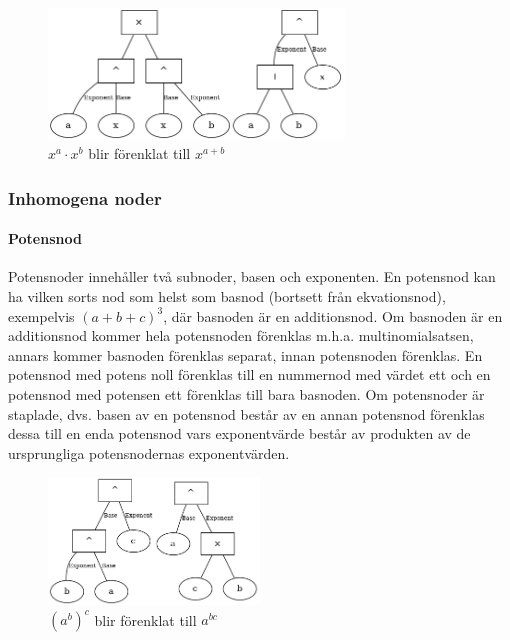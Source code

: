 \documentclass[12pt,a4paper]{article}
\begin{document}
\begin{figure}[H]
  \centering
  \includegraphics[width=0.7\textwidth]{pow.png}
  \caption{\(x^{a} \cdot x^{b}\) blir förenklat till \(x^{a+b}\)}
\end{figure}
\subsubsection{Inhomogena noder}
\paragraph{Potensnod}
\label{subsubsec:potensnod}
Potensnoder innehåller två subnoder, basen och exponenten. En potensnod kan ha vilken sorts nod som helst som basnod (bortsett från ekvationsnod), exempelvis \((a+b+c)^{3}\), där basnoden är en additionsnod. Om basnoden är en additionsnod kommer hela potensnoden förenklas m.h.a. multinomialsatsen, annars kommer basnoden förenklas separat, innan potensnoden förenklas. En potensnod med potens noll förenklas till en nummernod med värdet ett och en potensnod med potensen ett förenklas till bara basnoden. Om potensnoder är staplade, dvs. basen av en potensnod består av en annan potensnod förenklas dessa till en enda potensnod vars exponentvärde består av produkten av de ursprungliga potensnodernas exponentvärden.
\begin{figure}[h]
  \centering
  \includegraphics[width=0.5\textwidth]{pow2.png}
  \caption{\( \left( a^b \right) ^c\) blir förenklat till \(a^{bc}\)}
\end{figure}
\end{document}
